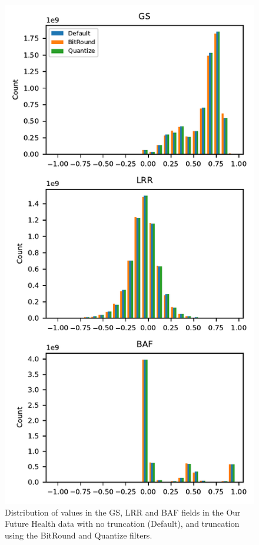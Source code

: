 \documentclass[a4paper,num-refs]{oup-contemporary}
\begin{document}
\begin{figure}[h]
\includegraphics{figures/ofh-histograms}
\caption{Distribution of values in the GS, LRR and BAF fields in the Our Future
Health data with no truncation (Default), and truncation using the BitRound
and Quantize filters.
\label{fig-ofh-field-distributions}}
\end{figure}
\end{document}
